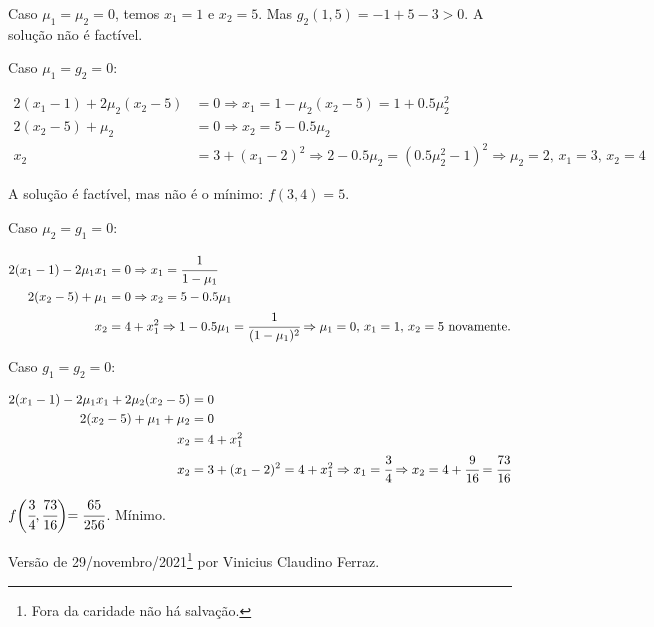 \documentclass{rbfin}
\begin{document}
Caso $\mu_1 = \mu_2 = 0$, temos $x_1 = 1$ e $x_2 = 5$. Mas $g_2(1,5) = -1 + 5 - 3 > 0$. A solução não é factível.

\vspace{3mm}

Caso $\mu_1 = g_2 = 0$:

\begin{align*}
  2(x_1 - 1) + 2 \mu_2 (x_2 - 5) &= 0 \Rightarrow x_1 = 1 - \mu_2 (x_2 - 5) = 1 + 0.5 \mu_2^2 \\
  2(x_2 - 5) + \mu_2 &= 0 \Rightarrow x_2 = 5 - 0.5 \mu_2 \\
  x_2 &= 3 + (x_1 - 2)^2 \Rightarrow 2 - 0.5 \mu_2 = (0.5 \mu_2^2 - 1)^2 \Rightarrow \mu_2 = 2,\,x_1 = 3,\,x_2 = 4
\end{align*}

A solução é factível, mas não é o mínimo: $f(3,4) = 5$.

\vspace{3mm}

Caso $\mu_2 = g_1 = 0$:

\begin{align*}
  2(x_1 - 1) - 2 \mu_1 x_1 &= 0 \Rightarrow x_1 = \cfrac{1}{1 - \mu_1} \\
  2(x_2 - 5) + \mu_1 &= 0 \Rightarrow x_2 = 5 - 0.5 \mu_1 \\
  x_2 &= 4 + x_1^2 \Rightarrow 1 - 0.5 \mu_1 = \cfrac{1}{(1 - \mu_1)^2} \Rightarrow \mu_1 = 0,\,x_1 = 1,\,x_2 = 5\text{ novamente.}
\end{align*}

Caso $g_1 = g_2 = 0$:

\begin{align*}
  2(x_1 - 1) - 2 \mu_1 x_1 + 2 \mu_2 (x_2 - 5) &= 0\\
  2(x_2 - 5) + \mu_1  + \mu_2 &= 0\\
  x_2 &= 4 + x_1^2\\
  x_2 &= 3 + (x_1 - 2)^2 = 4 + x_1^2 \Rightarrow x_1 = \cfrac{3}{4} \Rightarrow x_2 = 4 + \cfrac{9}{16} = \cfrac{73}{16}
\end{align*}

$f\biggl(\cfrac{3}{4}, \cfrac{73}{16}\biggl) = \cfrac{65}{256}$. Mínimo.

\vspace{6mm}

Versão de 29/novembro/2021\footnote{Fora da caridade não há salvação.}  por Vinicius Claudino Ferraz.
\end{document}

